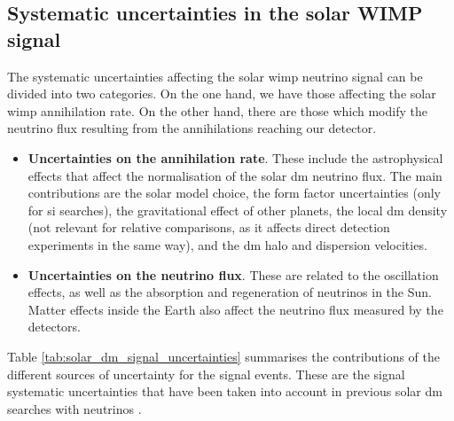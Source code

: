 \subsection{Systematic uncertainties in the solar WIMP signal}

The systematic uncertainties affecting the solar \gls{wimp} neutrino signal can be divided into two categories. On the one hand, we have those affecting the solar \gls{wimp} annihilation rate. On the other hand, there are those which modify the neutrino flux resulting from the annihilations reaching our detector.

\begin{itemize}
	\item \textbf{Uncertainties on the annihilation rate}. These include the astrophysical effects that affect the normalisation of the solar \gls{dm} neutrino flux. The main contributions are the solar model choice, the form factor uncertainties (only for \gls{si} searches), the gravitational effect of other planets, the local \gls{dm} density (not relevant for relative comparisons, as it affects direct detection experiments in the same way), and the \gls{dm} halo and dispersion velocities.
	\item \textbf{Uncertainties on the neutrino flux}. These are related to the oscillation effects, as well as the absorption and regeneration of neutrinos in the Sun. Matter effects inside the Earth also affect the neutrino flux measured by the detectors.
\end{itemize}

Table \ref{tab:solar_dm_signal_uncertainties} summarises the contributions of the different sources of uncertainty for the signal events. These are the signal systematic uncertainties that have been taken into account in previous solar \gls{dm} searches with neutrinos \cite{Boliev2013,Super-Kamiokande2015,Principato2021}.

